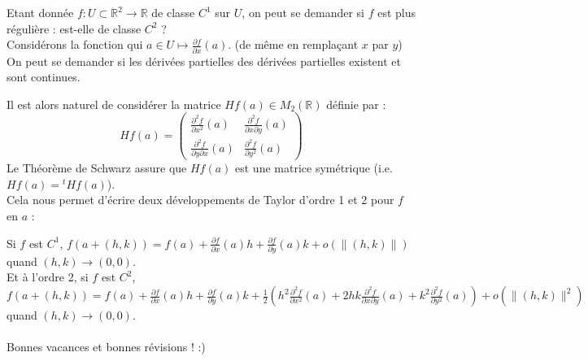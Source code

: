 \documentclass{article}
\begin{document}

Etant donnée $f : U \subset \mathbb{R}^2 \to \mathbb{R}$ de classe $C^1$ sur $U$, on peut se demander si $f$ est plus régulière : est-elle de classe $C^2$ ?\\
Considérons la fonction qui $a \in U \mapsto \frac{\partial f}{\partial x}(a)$. (de même en remplaçant $x$ par $y$)\\
On peut se demander si les dérivées partielles des dérivées partielles existent et sont continues.\\


Il est alors naturel de considérer la matrice $Hf(a) \in M_2(\mathbb{R})$ définie par :
\[
    Hf(a) = \begin{pmatrix}
        \frac{\partial^2 f}{\partial x^2}(a) & \frac{\partial^2 f}{\partial x \partial y}(a) \\
        \frac{\partial^2 f}{\partial y \partial x}(a) & \frac{\partial^2 f}{\partial y^2}(a)
    \end{pmatrix}
\]
Le Théorème de Schwarz assure que $Hf(a)$ est une matrice symétrique (i.e. $Hf(a) = { }^t Hf(a)$).\\
Cela nous permet d'écrire deux développements de Taylor d'ordre 1 et 2 pour $f$ en $a$ :

Si $f$ est $C^1$, $ f(a+(h,k)) = f(a) + \frac{\partial f}{\partial x}(a) h + \frac{\partial f}{\partial y}(a) k + o(\|(h,k)\|)$ quand $(h,k) \to (0,0)$.\\
Et à l'ordre 2, si $f$ est $C^2$,\\
$f(a+(h,k)) = f(a) + \frac{\partial f}{\partial x}(a) h + \frac{\partial f}{\partial y}(a) k + \frac{1}{2} (h^2 \frac{\partial^2 f}{\partial x^2}(a) + 2hk \frac{\partial^2 f}{\partial x \partial y}(a) + k^2 \frac{\partial^2 f}{\partial y^2}(a)) + o(\|(h,k)\|^2)$ quand $(h,k) \to (0,0)$.\\\\

Bonnes vacances et bonnes révisions ! :)
\newpage
\tableofcontents
\end{document}
